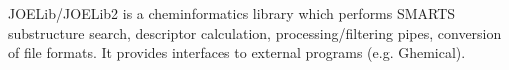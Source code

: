 JOELib/JOELib2 is a cheminformatics library which performs SMARTS substructure search, descriptor calculation, processing/filtering pipes, conversion of file formats. It provides interfaces to external programs (e.g. Ghemical).